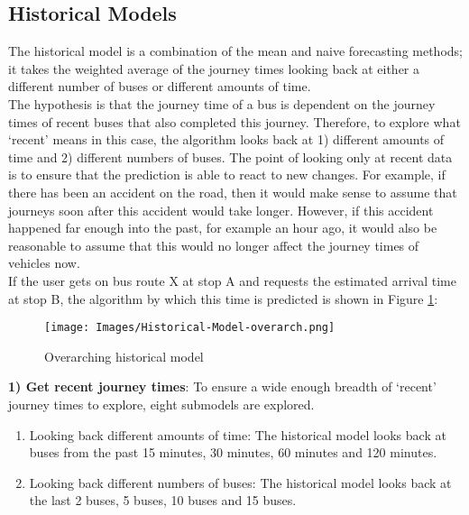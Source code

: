 \subsection{Historical Models}
\label{section:historical-model-design}

The historical model is a combination of the mean and naive forecasting methods; it takes the weighted average of the journey times looking back at either a different number of buses or different amounts of time. \\

The hypothesis is that the journey time of a bus is dependent on the journey times of recent buses that also completed this journey. Therefore, to explore what `recent' means in this case, the algorithm looks back at 1) different amounts of time and 2) different numbers of buses. The point of looking only at recent data is to ensure that the prediction is able to react to new changes. For example, if there has been an accident on the road, then it would make sense to assume that journeys soon after this accident would take longer. However, if this accident happened far enough into the past, for example an hour ago, it would also be reasonable to assume that this would no longer affect the journey times of vehicles now. \\

If the user gets on bus route X at stop A and requests the estimated arrival time at stop B, the algorithm by which this time is predicted is shown in Figure \ref{fig:historical-flow}: 

\begin{figure}[H]
\begin{center}
    \texttt{[image: Images/Historical-Model-overarch.png]}
    \caption{Overarching historical model}
    \label{fig:historical-flow}
\end{center}
\end{figure}

\textbf{1) Get recent journey times}: To ensure a wide enough breadth of `recent' journey times to explore, eight submodels are explored.

\begin{enumerate}[label=(\alph*)]

\item Looking back different amounts of time: The historical model looks back at buses from the past 15 minutes, 30 minutes, 60 minutes and 120 minutes. 

\item Looking back different numbers of buses: The historical model looks back at the last 2 buses, 5 buses, 10 buses and 15 buses.

\end{enumerate} 

